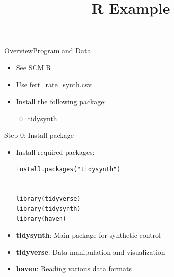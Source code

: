 \documentclass[dvipsnames,hyperref={pdfpagelabels=false}]{beamer}
\begin{document}
\title[]  
{R Example}


\author 
{}

\institute{}






\date
{}


\begin{frame}{}
\titlepage
\end{frame}




\begin{frame}{Overview}{Program and Data}
\begin{itemize}
	\item See SCM.R
	\vspace{0.2cm}
	\item Use fert\_rate\_synth.csv
	\vspace{0.2cm}
	\item Install the following package:
	\begin{itemize}
		\vspace{0.2cm}
		\item tidysynth 
		
		
	\end{itemize}
	
\end{itemize}
\end{frame}



\begin{frame}[fragile]{Step 0: Install package}
\begin{itemize}
	\item Install required packages:
	\vspace{0.2cm}
\begin{lstlisting}
install.packages("tidysynth")


library(tidyverse)
library(tidysynth)
library(haven)
\end{lstlisting}
	\item \textbf{tidysynth}: Main package for synthetic control
	\item \textbf{tidyverse}: Data manipulation and visualization
	\item \textbf{haven}: Reading various data formats
\end{itemize}
\end{frame}
\end{document}
